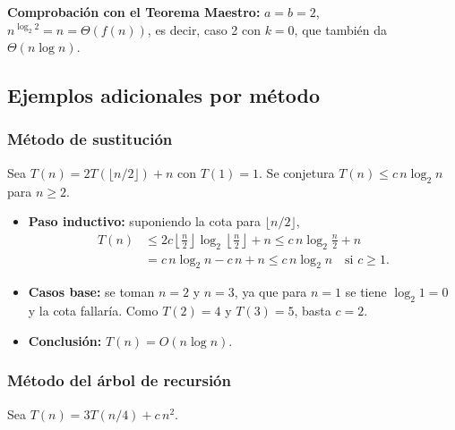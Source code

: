 \documentclass{article}
\begin{document}
        \textbf{Comprobación con el Teorema Maestro:} $a = b = 2$,
        $n^{\log_2 2} = n = \Theta(f(n))$, es decir, caso 2 con $k = 0$, que también
        da $\Theta(n\log n)$.
        
        \subsection{Ejemplos adicionales por método}
        
        \subsubsection{Método de sustitución}
        
        Sea $T(n) = 2T(\lfloor n/2\rfloor) + n$ con $T(1) = 1$. Se conjetura
        $T(n) \leq c\,n\log_2 n$ para $n \geq 2$.
        
        \begin{itemize}
        \item \textbf{Paso inductivo:} suponiendo la cota para $\lfloor n/2\rfloor$,
                \begin{align*}
                T(n) &\leq 2c\left\lfloor\frac{n}{2}\right\rfloor\log_2\left\lfloor\frac{n}{2}\right\rfloor + n
                        \leq c\,n\log_2\frac{n}{2} + n \\
                    &= c\,n\log_2 n - c\,n + n \leq c\,n\log_2 n
                    \quad \text{si } c \geq 1.
                \end{align*}
        \item \textbf{Casos base:} se toman $n = 2$ y $n = 3$, ya que para $n = 1$
                se tiene $\log_2 1 = 0$ y la cota fallaría. Como $T(2) = 4$ y
                $T(3) = 5$, basta $c = 2$.
        \item \textbf{Conclusión:} $T(n) = O(n\log n)$.
        \end{itemize}
        
        \subsubsection{Método del árbol de recursión}
        
        Sea $T(n) = 3T(n/4) + c\,n^2$.
        
\end{document}

